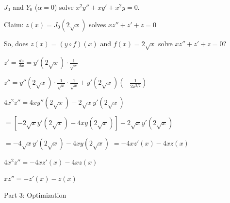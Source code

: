 \documentclass{beamer}
\begin{document}
\begin{frame}
\begin{center}

$J_0$ and $Y_0$ ($\alpha = 0$) solve $x^2 y'' + x y' + x^2 y = 0$.

\vskip 20pt
Claim: $z(x) = J_0(2\sqrt{x})$ solves $x z'' + z' + z = 0$

\vskip 20pt
So, does $z(x) = (y\circ f)(x)$ and $f(x) = 2\sqrt{x}$ solve $x z'' + z' + z = 0$?

\vskip 20pt 

$z' = \frac{dz}{dx} = y'(2\sqrt{x}) \cdot \frac{1}{\sqrt{x}}$

$z'' = y''(2\sqrt{x}) \cdot \frac{1}{\sqrt{x}} \cdot \frac{1}{\sqrt{x}} + y'(2\sqrt{x}) \left(-\frac{1}{2x^{3/2}}\right)$

\vskip 20pt 

$4 x^2 z'' = 4 x y''(2\sqrt{x}) - 2 \sqrt{x} y'(2\sqrt{x})$

$ = \left[ -2 \sqrt{x} y'(2\sqrt{x}) - 4x y(2\sqrt{x})\right] - 2 \sqrt{x} y'(2\sqrt{x})$

$ = -4 \sqrt{x} y'(2\sqrt{x}) - 4x y(2\sqrt{x})$
$ = -4 x z'(x) - 4x z(x)$

\vskip 20pt
$4 x^2 z'' = -4 x z'(x) - 4x z(x)$

$x z'' = - z'(x) - z(x)$
\end{center}
\end{frame}

\begin{frame}
\begin{exampleblock}{}
\begin{center}
\vskip 20pt
\Huge
Part 3: Optimization
\vskip 6pt
\ 
\end{center}
\end{exampleblock}
\end{frame}
\end{document}
